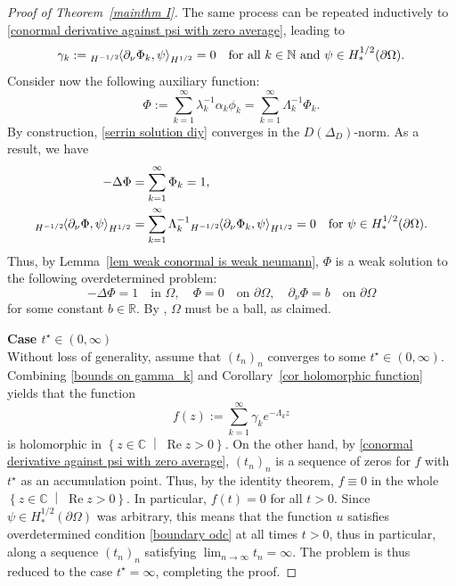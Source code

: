 \documentclass[a4paper,11pt]{article}
\newcommand\restr[2]{{%
\left.\kern-\nulldelimiterspace %
#1 %
\vphantom{|} %
\right|_{#2} %
}}
\newcommand{\re}{\mathop{\mathrm{Re}}}
\newcommand{\pairing}[2]{
{}_{{H^{-1/2}}}\hspace*{-1mm}\left\langle #1, #2\right\rangle_{H^{1/2}}
}  %
\newcommand\setbld[2]{\left\{ #1 \;\middle |\; #2\right\}}
\numberwithin{equation}{section}
\begin{document}
\begin{proof}[Proof of Theorem~\ref{mainthm I}]
The same process can be repeated inductively to \eqref{conormal derivative against psi with zero average}, leading to 
\begin{equation}\label{gamma_k=0}
 \gamma_k:=   \pairing{\partial_\nu \Phi_k}{\psi}=0 \quad \text{for all }k\in \mathbb{N} \text{ and }\psi\in H_*^{1/2}(\partial\Omega).
\end{equation}
Consider now the following auxiliary function:
\begin{equation}\label{serrin solution diy}
    \Phi:=\sum_{k=1}^\infty \lambda_k^{-1}\alpha_k \phi_k=
    \sum_{k=1}^\infty \Lambda_k^{-1}\Phi_k.
\end{equation}
By construction, \eqref{serrin solution diy} converges in the $D(\Delta_D)$-norm. As a result, we have 
\begin{equation*}
\begin{aligned}
-\Delta \Phi &= \sum_{k=1}^\infty \Phi_k =1,\\  \pairing{\partial_\nu\Phi}{\psi}&=\sum_{k=1}^\infty \Lambda_k^{-1} \pairing{\partial_\nu \Phi_k}{\psi} = 0 \quad \text{for }\psi\in H_*^{1/2}(\partial\Omega).
\end{aligned}
\end{equation*}
Thus, by Lemma~\ref{lem weak conormal is weak neumann}, $\Phi$ is a weak solution to the following overdetermined problem: 
\begin{equation*}
    -\Delta\Phi=1\quad \text{in }\Omega,\quad \Phi=0\quad \text{on }\partial\Omega, \quad \partial_\nu \Phi=b\quad \text{on }\partial\Omega
\end{equation*}
for some constant $b\in \mathbb{R}$. By \cite{figalli&zhang2025_serrin_rough_domains}, $\Omega$ must be a ball, as claimed.

\noindent\textbf{Case $t^\star\in(0,\infty)$}\\
Without loss of generality, assume that $(t_n)_n$ converges to some $t^\star\in (0,\infty)$. Combining \eqref{bounds on gamma_k} and Corollary~\ref{cor holomorphic function} yields that the function
\begin{equation*}
   f(z):=\sum_{k=1}^\infty \gamma_k e^{-\Lambda_k z} 
\end{equation*}
is holomorphic in $\setbld{z\in \mathbb{C}}{\re z>0}$. On the other hand, by \eqref{conormal derivative against psi with zero average}, $(t_n)_n$ is a sequence of zeros for $f$ with $t^\star$ as an accumulation point. Thus, by the identity theorem, $f\equiv 0$ in the whole $\setbld{z\in\mathbb{C}}{\re z>0}$. In particular, $f(t)=0$ for all $t>0$. Since $\psi\in H_*^{1/2}(\partial\Omega)$ was arbitrary, this means that the function $u$ satisfies overdetermined condition \eqref{boundary odc} at all times $t>0$, thus in particular, along a sequence $(t_n)_n$ satisfying $\lim_{n\to \infty }t_n=\infty$. The problem is thus reduced to the case $t^\star=\infty$, completing the proof.
\end{proof}
\end{document}

